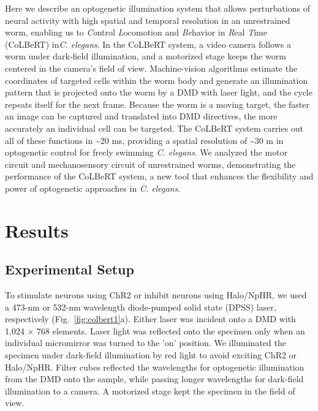 Here we describe an optogenetic illumination system that allows perturbations of neural activity with high spatial and temporal resolution in an unrestrained worm, enabling us to \emph{Co}ntrol \emph{L}ocomotion and \emph{Be}havior in \emph{R}eal \emph{T}ime (CoLBeRT) in\textit{C. elegans}. In the CoLBeRT system, a video camera follows a worm under dark-field illumination, and a motorized stage keeps the worm centered in the camera's field of view. Machine-vision algorithms estimate the coordinates of targeted cells within the worm body and generate an illumination pattern that is projected onto the worm by a DMD with laser light, and the cycle repeats itself for the next frame. Because the worm is a moving target, the faster an image can be captured and translated into DMD directives, the more accurately an individual cell can be targeted. The CoLBeRT system carries out all of these functions in \textasciitilde20 ms, providing a spatial resolution of \textasciitilde30 \textmu m in optogenetic control for freely swimming \textit{C. elegans}. We analyzed the motor circuit and mechanosensory circuit of unrestrained worms, demonstrating the performance of the CoLBeRT system, a new tool that enhances the flexibility and power of optogenetic approaches in \textit{C. elegans}.

\section{Results}
\subsection{Experimental Setup}
To stimulate neurons using ChR2 or inhibit neurons using Halo/NpHR, we used a 473-nm or 532-nm wavelength diode-pumped solid state (DPSS) laser, respectively  (Fig.~\ref{fig:colbert1}a). Either laser was incident onto a DMD with 1,024 × 768 elements. Laser light was reflected onto the specimen only when an individual micromirror was turned to the 'on' position. We illuminated the specimen under dark-field illumination by red light to avoid exciting ChR2 or Halo/NpHR. Filter cubes reflected the wavelengths for optogenetic illumination from the DMD onto the sample, while passing longer wavelengths for dark-field illumination to a camera. A motorized stage kept the specimen in the field of view.



